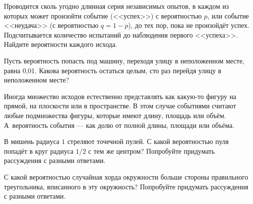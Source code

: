 \documentclass[a4paper,11pt]{article}
\begin{document}
Проводится сколь угодно длинная серия независимых опытов, в каждом из которых может произойти событие (<<успех>>) с вероятностью $p$, или событие <<неудача>> (с вероятностью $q=1-p$), до тех пор, пока не произойдёт успех.
Подсчитывается количество испытаний до наблюдения первого <<успеха>>.
Найдите вероятности каждого исхода.













Пусть вероятность попасть под машину, переходя улицу в неположенном
месте, равна 0{,}01. Какова вероятность остаться целым, сто раз
перейдя улицу в неположенном месте?














{\small
Иногда множество исходов естественно представлять как какую-то фигуру на прямой, на плоскости или в пространстве.
В этом случае событиями считают любые подмножества фигуры, которые имеют длину, площадь или объём.
А~вероятность события --- как долю от полной длины, площади или объёма.
\par}


В мишень радиуса $1$ стреляют точечной пулей.
С какой вероятностью пуля попадёт в круг радиуса $1/2$ с тем же центром?
Попробуйте придумать рассуждения с разными ответами.













С какой вероятностью случайная хорда окружности больше
стороны правильного треугольника, вписанного в эту окружность?
Попробуйте придумать рассуждения с разными ответами.
\end{document}
